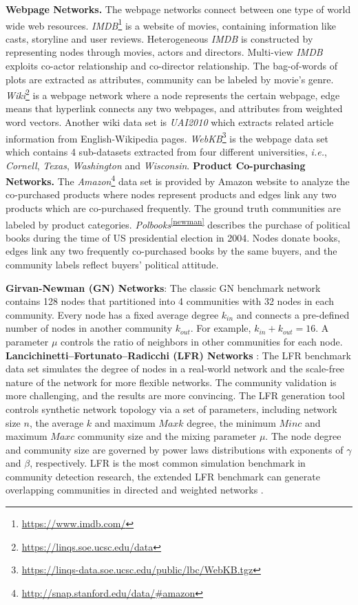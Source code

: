 \textbf{Webpage Networks.} The webpage networks connect between one type of world wide web resources. \textit{IMDB}\footnote{\url{https://www.imdb.com/}} is a website of movies, containing information like casts, storyline and user reviews. Heterogeneous \textit{IMDB} is constructed by representing nodes through movies, actors and directors. Multi-view \textit{IMDB} exploits co-actor relationship and co-director relationship. The bag-of-words of plots are extracted as attributes, community can be labeled by movie's genre. \textit{Wiki}\footnote{\url{https://linqs.soe.ucsc.edu/data}} is a webpage network where a node represents the certain webpage, edge means that hyperlink connects any two webpages, and attributes from weighted word vectors. Another wiki data set is \textit{UAI2010} which extracts related article information from English-Wikipedia pages. \textit{WebKB}\footnote{\url{https://linqs-data.soe.ucsc.edu/public/lbc/WebKB.tgz}} is the webpage data set which contains 4 sub-datasets extracted from four different universities, \textit{i.e.}, \textit{Cornell}, \textit{Texas}, \textit{Washington} and \textit{Wisconsin}.
\textbf{Product Co-purchasing Networks.}
The \textit{Amazon}\footnote{\url{http://snap.stanford.edu/data/\#amazon}} data set is provided by Amazon website to analyze the co-purchased products where nodes represent products and edges link any two products which are co-purchased frequently. The ground truth communities are labeled by product categories. \textit{Polbooks}\textsuperscript{\ref{newman}} describes the purchase of political books during the time of US presidential election in 2004. Nodes donate books, edges link any two frequently co-purchased books by the same buyers, and the community labels reflect buyers' political attitude.

\textbf{Girvan-Newman (GN) Networks}:
The classic GN benchmark network contains 128 nodes that partitioned into 4 communities with 32 nodes in each community. Every node has a fixed average degree $k_{in}$ and connects a pre-defined number of nodes in another community $k_{out}$. For example, $k_{in}+k_{out}=16$. A parameter $\mu$ controls the ratio of neighbors in other communities for each node.
\textbf{Lancichinetti–Fortunato–Radicchi (LFR) Networks} : The LFR benchmark data set simulates the degree of nodes in a real-world network and the scale-free nature of the network for more flexible networks. The community validation is more challenging, and the results are more convincing. The LFR generation tool controls synthetic network topology via a set of parameters, including network size $n$, the average $k$ and maximum $Maxk$ degree, the minimum $Minc$ and maximum $Maxc$ community size and the mixing parameter $\mu$. The node degree and community size are governed by power laws distributions with exponents of $\gamma$ and $\beta$, respectively.
LFR is the most common simulation benchmark in community detection research, the extended LFR benchmark can generate overlapping communities in directed and weighted networks .

